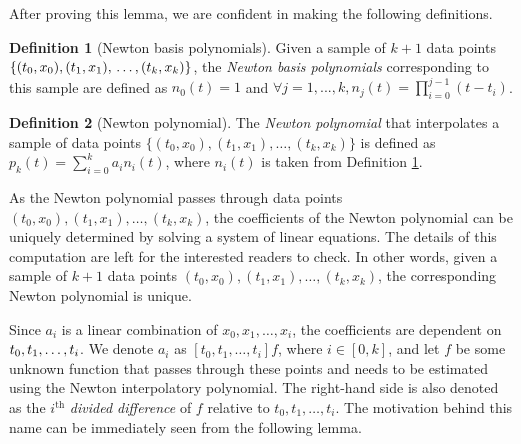 \documentclass[a4paper,11pt,titlepage]{article}
\theoremstyle{definition}
\newtheorem{definition}{Definition}[section]
\theoremstyle{plain}
\theoremstyle{remark}
\begin{document}
After proving this lemma, we are confident in making the following definitions.

\begin{definition}
    [Newton basis polynomials] Given a sample of $k+1$ data points
$\{(t_0,x_0), (t_1,x_1), \\\dots, (t_k,x_k)\}$, the \textit{Newton basis polynomials} corresponding to this sample are defined as $n_0(t)=1$ and $\forall j=1,...,k, n_j(t)=\prod_{i=0}^{j-1}(t-t_i)$.
\label{def:nbp}
\end{definition}

\begin{definition}
    [Newton polynomial] The \textit{Newton polynomial} that interpolates a sample of data points $\{(t_0,x_0), (t_1,x_1), \dots, (t_k,x_k)\}$ is defined as $p_k(t)=\sum_{i=0}^ka_in_i(t)$, where $n_i(t)$ is taken from Definition \ref{def:nbp}.
\end{definition}

As the Newton polynomial passes through data points $(t_0,x_0), (t_1,x_1), \dots, (t_k,x_k)$, the coefficients of the Newton polynomial can be uniquely determined by solving a system of linear equations. The details of this computation are left for the interested readers to check. In other words, given a sample of $k+1$ data points
$(t_0,x_0), (t_1,x_1), \dots, (t_k,x_k)$, the corresponding Newton polynomial is unique.

Since $a_i$ is a linear combination of $x_0,x_1,\dots,x_i$, the coefficients are dependent on $t_0,t_1,\dots,\\t_i$. We denote $a_i$ as $[t_0,t_1,\dots,t_i]f$, where $i\in[0,k]$, and let $f$ be some unknown function that passes through these points and needs to be estimated using the Newton interpolatory polynomial. The right-hand side is also denoted as the $i^{\mathrm{th}}$ \textit{divided difference} of $f$ relative to $t_0,t_1,\dots,t_i$. The motivation behind this name can be immediately seen from the following lemma.
\end{document}
